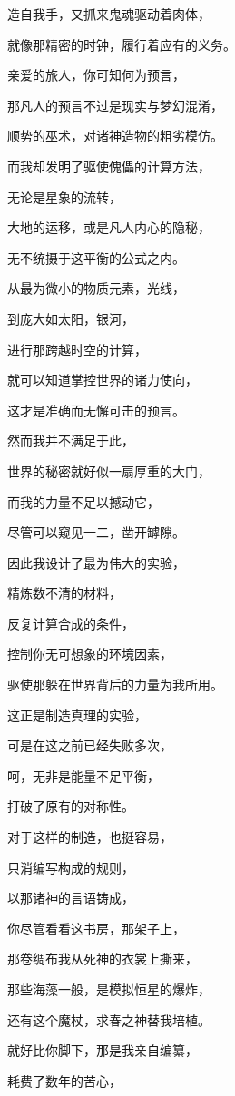 \documentclass[UTF8]{article}
\begin{document}
\par 造自我手，又抓来鬼魂驱动着肉体，
\par 就像那精密的时钟，履行着应有的义务。
\par 亲爱的旅人，你可知何为预言，
\par 那凡人的预言不过是现实与梦幻混淆，
\par 顺势的巫术，对诸神造物的粗劣模仿。
\par 而我却发明了驱使傀儡的计算方法，
\par 无论是星象的流转，
\par 大地的运移，或是凡人内心的隐秘，
\par 无不统摄于这平衡的公式之内。
\par 从最为微小的物质元素，光线，
\par 到庞大如太阳，银河，
\par 进行那跨越时空的计算，
\par 就可以知道掌控世界的诸力使向，
\par 这才是准确而无懈可击的预言。
\par 然而我并不满足于此，
\par 世界的秘密就好似一扇厚重的大门，
\par 而我的力量不足以撼动它，
\par 尽管可以窥见一二，凿开罅隙。
\par 因此我设计了最为伟大的实验，
\par 精炼数不清的材料，
\par 反复计算合成的条件，
\par 控制你无可想象的环境因素，
\par 驱使那躲在世界背后的力量为我所用。
\par 这正是制造真理的实验，
\par 可是在这之前已经失败多次，
\par 呵，无非是能量不足平衡，
\par 打破了原有的对称性。
\par 对于这样的制造，也挺容易，
\par 只消编写构成的规则，
\par 以那诸神的言语铸成，
\par 你尽管看看这书房，那架子上，
\par 那卷绸布我从死神的衣裳上撕来，
\par 那些海藻一般，是模拟恒星的爆炸，
\par 还有这个魔杖，求春之神替我培植。
\par 就好比你脚下，那是我亲自编纂，
\par 耗费了数年的苦心，
\end{document}
